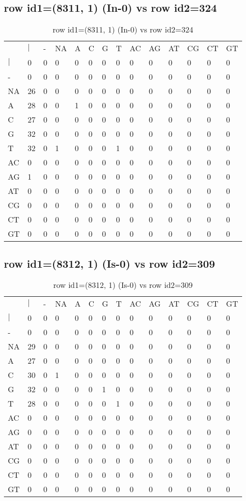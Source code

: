 \subsection{row id1=(8311, 1) (In-0) vs row id2=324}
\begin{center}
\begin{longtable}{|l|l|l|l|l|l|l|l|l|l|l|l|l|l|}
\caption{row id1=(8311, 1) (In-0) vs row id2=324} \label{table_dm496}\\
\hline
\\
\hline
&$|$&-&NA&A&C&G&T&AC&AG&AT&CG&CT&GT\\
$|$&0&0&0&0&0&0&0&0&0&0&0&0&0\\
-&0&0&0&0&0&0&0&0&0&0&0&0&0\\
NA&26&0&0&0&0&0&0&0&0&0&0&0&0\\
A&28&0&0&1&0&0&0&0&0&0&0&0&0\\
C&27&0&0&0&0&0&0&0&0&0&0&0&0\\
G&32&0&0&0&0&0&0&0&0&0&0&0&0\\
T&32&0&1&0&0&0&1&0&0&0&0&0&0\\
AC&0&0&0&0&0&0&0&0&0&0&0&0&0\\
AG&1&0&0&0&0&0&0&0&0&0&0&0&0\\
AT&0&0&0&0&0&0&0&0&0&0&0&0&0\\
CG&0&0&0&0&0&0&0&0&0&0&0&0&0\\
CT&0&0&0&0&0&0&0&0&0&0&0&0&0\\
GT&0&0&0&0&0&0&0&0&0&0&0&0&0\\
\hline
\end{longtable}
\end{center}

\subsection{row id1=(8312, 1) (Is-0) vs row id2=309}
\begin{center}
\begin{longtable}{|l|l|l|l|l|l|l|l|l|l|l|l|l|l|}
\caption{row id1=(8312, 1) (Is-0) vs row id2=309} \label{table_dm498}\\
\hline
\\
\hline
&$|$&-&NA&A&C&G&T&AC&AG&AT&CG&CT&GT\\
$|$&0&0&0&0&0&0&0&0&0&0&0&0&0\\
-&0&0&0&0&0&0&0&0&0&0&0&0&0\\
NA&29&0&0&0&0&0&0&0&0&0&0&0&0\\
A&27&0&0&0&0&0&0&0&0&0&0&0&0\\
C&30&0&1&0&0&0&0&0&0&0&0&0&0\\
G&32&0&0&0&0&1&0&0&0&0&0&0&0\\
T&28&0&0&0&0&0&1&0&0&0&0&0&0\\
AC&0&0&0&0&0&0&0&0&0&0&0&0&0\\
AG&0&0&0&0&0&0&0&0&0&0&0&0&0\\
AT&0&0&0&0&0&0&0&0&0&0&0&0&0\\
CG&0&0&0&0&0&0&0&0&0&0&0&0&0\\
CT&0&0&0&0&0&0&0&0&0&0&0&0&0\\
GT&0&0&0&0&0&0&0&0&0&0&0&0&0\\
\hline
\end{longtable}
\end{center}

